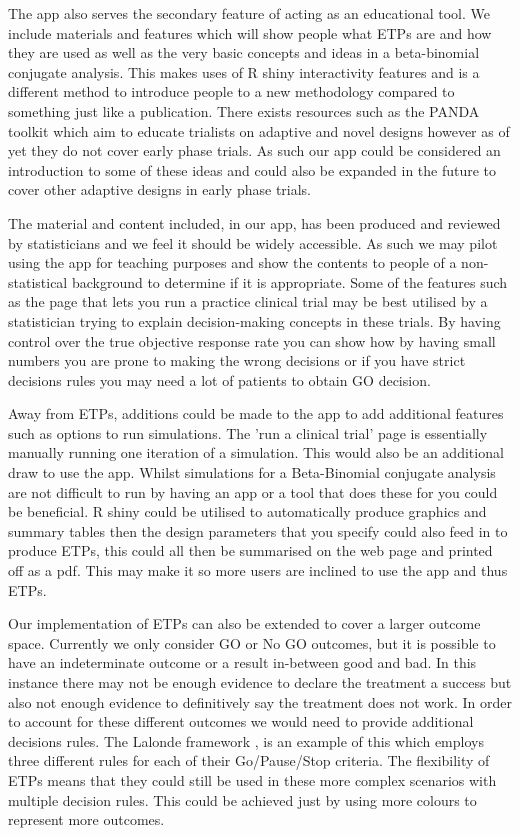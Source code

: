 The app also serves the secondary feature of acting as an educational tool. We include materials and features which will show people what ETPs are and how they are used as well as the very basic concepts and ideas in a beta-binomial conjugate analysis. This makes uses of R shiny interactivity features and is a different method to introduce people to a new methodology compared to something just like a publication. There exists resources such as the PANDA toolkit \cite{dimairoPANDAPracticalAdaptive2022} which aim to educate trialists on adaptive and novel designs however as of yet they do not cover early phase trials. As such our app could be considered an introduction to some of these ideas and could also be expanded in the future to cover other adaptive designs in early phase trials.   

The material and content included, in our app, has been produced and reviewed by statisticians and we feel it should be widely accessible. As such we may pilot using the app for teaching purposes and show the contents to people of a non-statistical background to determine if it is appropriate. Some of the features such as the page that lets you run a practice clinical trial may be best utilised by a statistician trying to explain decision-making concepts in these trials. By having control over the true objective response rate you can show how by having small numbers you are prone to making the wrong decisions or if you have strict decisions rules you may need a lot of patients to obtain GO decision. 

Away from ETPs, additions could be made to the app to add additional features such as options to run simulations. The 'run a clinical trial' page is essentially manually running one iteration of a simulation. This would also be an additional draw to use the app. Whilst simulations for a Beta-Binomial conjugate analysis are not difficult to run by having an app or a tool that does these for you could be beneficial. R shiny could be utilised to automatically produce graphics and summary tables then the design parameters that you specify could also feed in to produce ETPs, this could all then be summarised on the web page and printed off as a pdf. This may make it so more users are inclined to use the app and thus ETPs. 

Our implementation of ETPs can also be extended to cover a larger outcome space. Currently we only consider GO or No GO outcomes, but it is possible to have an indeterminate outcome or a result in-between good and bad. In this instance there may not be enough evidence to declare the treatment a success but also not enough evidence to definitively say the treatment does not work. In order to account for these different outcomes we would need to provide additional decisions rules. The Lalonde framework \cite{lalondeModelbasedDrugDevelopment2007}, is an example of this which employs three different rules for each of their Go/Pause/Stop criteria. The flexibility of ETPs means that they could still be used in these more complex scenarios with multiple decision rules. This could be achieved just by using more colours to represent more outcomes. 

